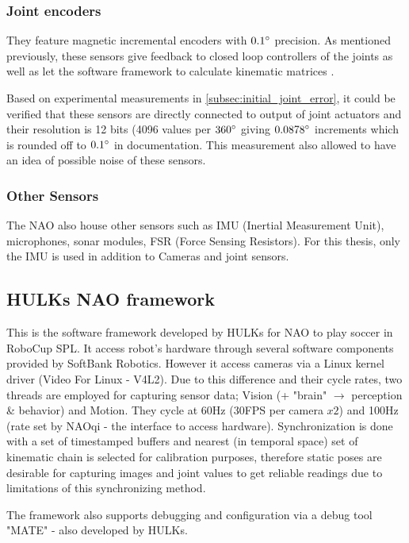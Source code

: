 \documentclass[english, printversion, nomenclature, notitle]{tuvisionthesis} %
\makeatletter
\renewcommand{\todo}[2][]{\tikzexternaldisable\@todo[#1]{#2}\tikzexternalenable}
\makeatother
\begin{document}
\subsubsection{Joint encoders}
\label{subsub:jointEncoders}

They feature magnetic incremental encoders with $0.1\degree$ precision. As mentioned previously, these sensors give feedback to closed loop controllers of the joints as well as let the software framework to calculate kinematic matrices \cite{softbank_robotics_joint_nodate}.

Based on experimental measurements in \cref{subsec:initial_joint_error}, it could be verified that these sensors are directly connected to output of joint actuators and their resolution is 12 bits (4096 values per $360\degree$ giving $0.0878\degree$ increments which is rounded off to $0.1\degree$ in documentation. This measurement also allowed to have an idea of possible noise of these sensors.

\subsubsection{Other Sensors}
The NAO also house other sensors such as IMU (Inertial Measurement Unit), microphones, sonar modules, FSR (Force Sensing Resistors). For this thesis, only the IMU is used in addition to Cameras and joint sensors.

\subsection{HULKs NAO framework}
This is the software framework developed by HULKs for NAO to play soccer in RoboCup SPL. It access robot's hardware through several software components provided by SoftBank Robotics. However it access cameras via a Linux kernel driver (Video For Linux - V4L2). Due to this difference and their cycle rates, two threads are employed for capturing sensor data; Vision (+ "brain" $\rightarrow$ perception \& behavior) and Motion. They cycle at 60Hz (30FPS per camera $x 2$) and 100Hz (rate set by NAOqi - the interface to access hardware)\todo{V6 updates}. Synchronization is done with a set of timestamped buffers and nearest (in temporal space) set of kinematic chain is selected for calibration purposes, therefore static poses are desirable for capturing images and joint values to get reliable readings due to limitations of this synchronizing method.

The framework also supports debugging and configuration via a debug tool "MATE" - also developed by HULKs.
\end{document}
